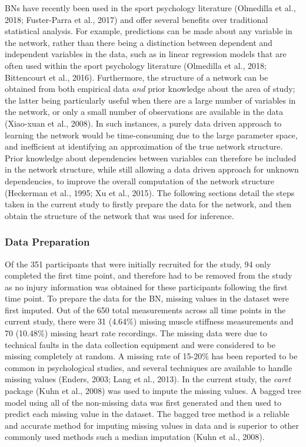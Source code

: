 \documentclass[utf8]{frontiersHLTH}
\begin{document}
BNs have recently been used in the sport psychology literature
(Olmedilla et al., 2018; Fuster-Parra et al., 2017) and offer several
benefits over traditional statistical analysis. For example, predictions
can be made about any variable in the network, rather than there being a
distinction between dependent and independent variables in the data,
such as in linear regression models that are often used within the sport
psychology literature (Olmedilla et al., 2018; Bittencourt et al.,
2016). Furthermore, the structure of a network can be obtained from both
empirical data \emph{and} prior knowledge about the area of study; the
latter being particularly useful when there are a large number of
variables in the network, or only a small number of observations are
available in the data (Xiao-xuan et al., 2008). In such instances, a
purely data driven approach to learning the network would be
time-consuming due to the large parameter space, and inefficient at
identifying an approximation of the true network structure. Prior
knowledge about dependencies between variables can therefore be included
in the network structure, while still allowing a data driven approach
for unknown dependencies, to improve the overall computation of the
network structure (Heckerman et al., 1995; Xu et al., 2015). The
following sections detail the steps taken in the current study to
firstly prepare the data for the network, and then obtain the structure
of the network that was used for inference.

\hypertarget{data-preparation}{%
\subsubsection*{Data Preparation}\label{data-preparation}}

Of the 351 participants that were initially recruited for the study, 94
only completed the first time point, and therefore had to be removed
from the study as no injury information was obtained for these
participants following the first time point. To prepare the data for the
BN, missing values in the dataset were first imputed. Out of the 650
total measurements across all time points in the current study, there
were 31 (4.64\%) missing muscle stiffness measurements and 70 (10.48\%)
missing heart rate recordings. The missing data were due to technical
faults in the data collection equipment and were considered to be
missing completely at random. A missing rate of 15-20\% has been
reported to be common in psychological studies, and several techniques
are available to handle missing values (Enders, 2003; Lang et al.,
2013). In the current study, the \emph{caret} package (Kuhn et al.,
2008) was used to impute the missing values. A bagged tree model using
all of the non-missing data was first generated and then used to predict
each missing value in the dataset. The bagged tree method is a reliable
and accurate method for imputing missing values in data and is superior
to other commonly used methods such a median imputation (Kuhn et al.,
2008).
\end{document}

